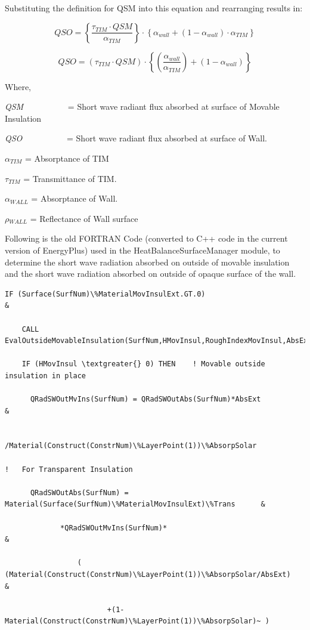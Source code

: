 Substituting the definition for QSM into this equation and rearranging results in:

\begin{equation}
QSO = \left\{ {\frac{{{\tau_{TIM}}\cdot QSM}}{{{\alpha_{TIM}}}}} \right\}\cdot \left\{ {{\alpha_{wall}} + \left( {1 - {\alpha_{wall}}} \right)\cdot {\alpha_{TIM}}} \right\}
\end{equation}

\begin{equation}
QSO = \left( {{\tau_{TIM}}\cdot QSM} \right)\cdot \left\{ {\left( {\frac{{{\alpha_{wall}}}}{{{\alpha_{TIM}}}}} \right) + \left( {1 - {\alpha_{wall}}} \right)} \right\}
\end{equation}

Where,

\emph{QSM}~~~~~~~~~~ = Short wave radiant flux absorbed at surface of Movable Insulation

\emph{QSO}~~~~~~~~~~ = Short wave radiant flux absorbed at surface of Wall.

$\alpha$\(_{TIM}\) = Absorptance of TIM

$\tau$\(_{TIM}\) = Transmittance of TIM.

$\alpha$\(_{WALL}\) = Absorptance of Wall.

$\rho$\(_{WALL}\) = Reflectance of Wall surface

Following is the old FORTRAN Code (converted to C++ code in the current version of EnergyPlus) used in the HeatBalanceSurfaceManager module, to determine the short wave radiation absorbed on outside of movable insulation and the short wave radiation absorbed on outside of opaque surface of the wall.

\begin{lstlisting}
IF (Surface(SurfNum)\%MaterialMovInsulExt.GT.0)                                           &

    CALL EvalOutsideMovableInsulation(SurfNum,HMovInsul,RoughIndexMovInsul,AbsExt)

    IF (HMovInsul \textgreater{} 0) THEN    ! Movable outside insulation in place

      QRadSWOutMvIns(SurfNum) = QRadSWOutAbs(SurfNum)*AbsExt                              &

                       /Material(Construct(ConstrNum)\%LayerPoint(1))\%AbsorpSolar

!   For Transparent Insulation

      QRadSWOutAbs(SurfNum) = Material(Surface(SurfNum)\%MaterialMovInsulExt)\%Trans      &

             *QRadSWOutMvIns(SurfNum)*                                                    &

                 (  (Material(Construct(ConstrNum)\%LayerPoint(1))\%AbsorpSolar/AbsExt)   &

                        +(1-Material(Construct(ConstrNum)\%LayerPoint(1))\%AbsorpSolar)~ )
\end{lstlisting}

